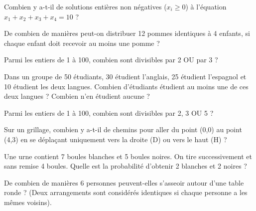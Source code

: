 \begin{exercicebox}
Combien y a-t-il de solutions entières non négatives ($x_i \ge 0$) à l'équation $x_1 + x_2 + x_3 + x_4 = 10$ ?
\end{exercicebox}

\begin{exercicebox}
De combien de manières peut-on distribuer 12 pommes identiques à 4 enfants, si chaque enfant doit recevoir au moins une pomme ?
\end{exercicebox}


\begin{exercicebox}
Parmi les entiers de 1 à 100, combien sont divisibles par 2 OU par 3 ?
\end{exercicebox}

\begin{exercicebox}
Dans un groupe de 50 étudiants, 30 étudient l'anglais, 25 étudient l'espagnol et 10 étudient les deux langues. Combien d'étudiants étudient au moins une de ces deux langues ? Combien n'en étudient aucune ?
\end{exercicebox}

\begin{exercicebox}
Parmi les entiers de 1 à 100, combien sont divisibles par 2, 3 OU 5 ?
\end{exercicebox}


\begin{exercicebox}
Sur un grillage, combien y a-t-il de chemins pour aller du point (0,0) au point (4,3) en se déplaçant uniquement vers la droite (D) ou vers le haut (H) ?
\end{exercicebox}

\begin{exercicebox}
Une urne contient 7 boules blanches et 5 boules noires. On tire successivement et sans remise 4 boules. Quelle est la probabilité d'obtenir 2 blanches et 2 noires ?
\end{exercicebox}

\begin{exercicebox}
De combien de manières 6 personnes peuvent-elles s'asseoir autour d'une table ronde ? (Deux arrangements sont considérés identiques si chaque personne a les mêmes voisins).
\end{exercicebox}


